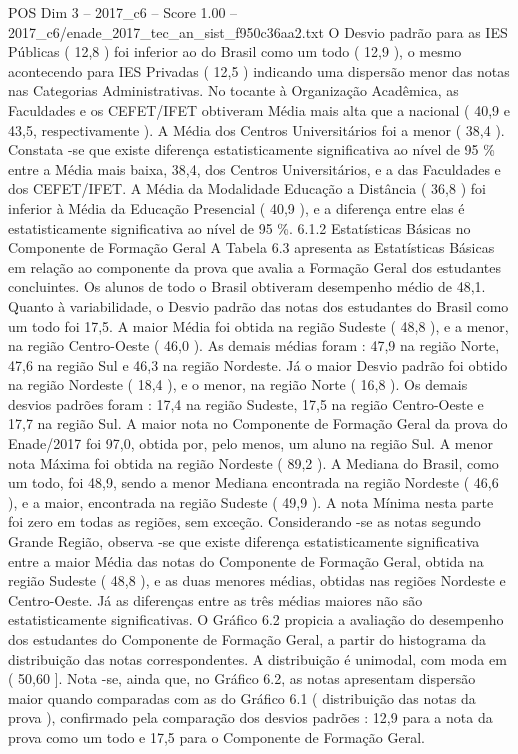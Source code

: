 \begin{textsample}{POS Dim 3 – 2017\_c6 – Score 1.00 – 2017\_c6/enade\_2017\_tec\_an\_sist\_f950c36aa2.txt}
O Desvio padrão para as IES Públicas ( 12,8 ) foi inferior ao do Brasil como um todo ( 12,9 ), o mesmo acontecendo para IES Privadas ( 12,5 ) indicando uma dispersão menor das notas nas Categorias Administrativas.
No tocante à Organização Acadêmica, as Faculdades e os CEFET/IFET obtiveram Média mais alta que a nacional ( 40,9 e 43,5, respectivamente ).
A Média dos Centros Universitários foi a menor ( 38,4 ).
Constata -se que existe diferença estatisticamente significativa ao nível de 95 \% entre a Média mais baixa, 38,4, dos Centros Universitários, e a das Faculdades e dos CEFET/IFET.
A Média da Modalidade Educação a Distância ( 36,8 ) foi inferior à Média da Educação Presencial ( 40,9 ), e a diferença entre elas é estatisticamente significativa ao nível de 95 \%. 6.1.2 Estatísticas Básicas no Componente de Formação Geral A Tabela 6.3 apresenta as Estatísticas Básicas em relação ao componente da prova que avalia a Formação Geral dos estudantes concluintes.
Os alunos de todo o Brasil obtiveram desempenho médio de 48,1.
Quanto à variabilidade, o Desvio padrão das notas dos estudantes do Brasil como um todo foi 17,5.
A maior Média foi obtida na região Sudeste ( 48,8 ), e a menor, na região Centro-Oeste ( 46,0 ).
As demais médias foram : 47,9 na região Norte, 47,6 na região Sul e 46,3 na região Nordeste.
Já o maior Desvio padrão foi obtido na região Nordeste ( 18,4 ), e o menor, na região Norte ( 16,8 ).
Os demais desvios padrões foram : 17,4 na região Sudeste, 17,5 na região Centro-Oeste e 17,7 na região Sul.
A maior nota no Componente de Formação Geral da prova do Enade/2017 foi 97,0, obtida por, pelo menos, um aluno na região Sul.
A menor nota Máxima foi obtida na região Nordeste ( 89,2 ).
A Mediana do Brasil, como um todo, foi 48,9, sendo a menor Mediana encontrada na região Nordeste ( 46,6 ), e a maior, encontrada na região Sudeste ( 49,9 ).
A nota Mínima nesta parte foi zero em todas as regiões, sem exceção.
Considerando -se as notas segundo Grande Região, observa -se que existe diferença estatisticamente significativa entre a maior Média das notas do Componente de Formação Geral, obtida na região Sudeste ( 48,8 ), e as duas menores médias, obtidas nas regiões Nordeste e Centro-Oeste.
Já as diferenças entre as três médias maiores não são estatisticamente significativas.
O Gráfico 6.2 propicia a avaliação do desempenho dos estudantes do Componente de Formação Geral, a partir do histograma da distribuição das notas correspondentes.
A distribuição é unimodal, com moda em ( 50,60 ].
Nota -se, ainda que, no Gráfico 6.2, as notas apresentam dispersão maior quando comparadas com as do Gráfico 6.1 ( distribuição das notas da prova ), confirmado pela comparação dos desvios padrões : 12,9 para a nota da prova como um todo e 17,5 para o Componente de Formação Geral.

\end{textsample}
